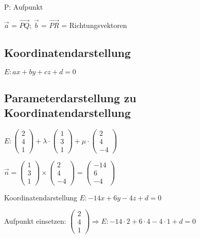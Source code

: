 \begin{multicols*}{3}
    {P: Aufpunkt}

    {$ \vec{a}$ = $\overrightarrow{PQ} $; $ \vec{b}$ = $\overrightarrow{PR} $ = Richtungsvektoren}



    \subsection{Koordinatendarstellung}
    {$E: ax + by + cz + d = 0 $}

    \subsection{Parameterdarstellung zu Koordinatendarstellung}

    $ E: \begin{pmatrix}
            2 \\
            4 \\
            1
        \end{pmatrix} + \lambda \cdot
        \begin{pmatrix}
            1 \\
            3 \\
            1
        \end{pmatrix} + \mu \cdot
        \begin{pmatrix}
            2 \\
            4 \\
            -4
        \end{pmatrix}$

     $\vec{n}=
        \begin{pmatrix}
            1 \\
            3 \\
            1
        \end{pmatrix} \times \begin{pmatrix}
            2 \\
            4 \\
            -4
        \end{pmatrix} = \begin{pmatrix}
            -14 \\
            6   \\
            -4
        \end{pmatrix} $

     Koordinatendarstellung $ E: -14x + 6y - 4z + d = 0$

     Aufpunkt einsetzen: $\begin{pmatrix}
            2 \\
            4 \\
            1
        \end{pmatrix} 	\Rightarrow  E: -14 \cdot 2  + 6 \cdot 4 - 4\cdot 1 + d = 0 $


\end{multicols*}
